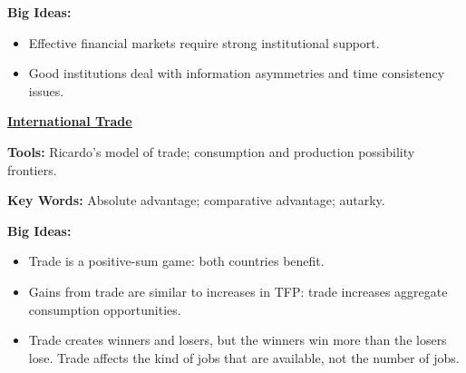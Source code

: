\textbf{Big Ideas:}
\vspace{-0.1in}
\begin{itemize}
\item Effective financial markets require strong institutional support.
\item Good institutions deal with information asymmetries and time consistency issues.
\end{itemize}

\hyperref[chp:intr]{\textbf{\underline{International Trade}}}

\textbf{Tools:} Ricardo's model of trade; consumption and production possibility frontiers.

\textbf{Key Words:} Absolute advantage; comparative advantage; autarky.

\textbf{Big Ideas:}
\vspace{-0.1in}
\begin{itemize}
\item Trade is a positive-sum game:  both countries benefit.
\item Gains from trade are similar to increases in TFP:  trade increases aggregate consumption opportunities.
\item Trade creates winners and losers, but the winners win more than the losers lose.
 Trade affects the kind of jobs that are available, not the number of jobs.
\end{itemize}



